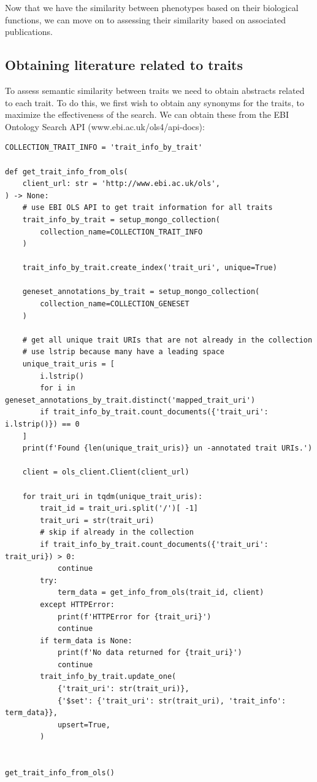 Now that we have the similarity between phenotypes based on their biological functions, we can move on to assessing their similarity based on associated publications.

\subsection{Obtaining literature related to traits}

To assess semantic similarity between traits we need to obtain abstracts related to each trait.  To do this, we first wish to obtain any synonyms for the traits, to maximize the effectiveness of the search.  We can obtain these from the EBI Ontology Search API (www.ebi.ac.uk/ols4/api-docs):

\begin{lstlisting}[style=Python]
COLLECTION_TRAIT_INFO = 'trait_info_by_trait'

def get_trait_info_from_ols(
    client_url: str = 'http://www.ebi.ac.uk/ols',
) -> None:
    # use EBI OLS API to get trait information for all traits
    trait_info_by_trait = setup_mongo_collection(
        collection_name=COLLECTION_TRAIT_INFO
    )

    trait_info_by_trait.create_index('trait_uri', unique=True)

    geneset_annotations_by_trait = setup_mongo_collection(
        collection_name=COLLECTION_GENESET
    )

    # get all unique trait URIs that are not already in the collection
    # use lstrip because many have a leading space
    unique_trait_uris = [
        i.lstrip()
        for i in geneset_annotations_by_trait.distinct('mapped_trait_uri')
        if trait_info_by_trait.count_documents({'trait_uri': i.lstrip()}) == 0
    ]
    print(f'Found {len(unique_trait_uris)} un -annotated trait URIs.')

    client = ols_client.Client(client_url)

    for trait_uri in tqdm(unique_trait_uris):
        trait_id = trait_uri.split('/')[ -1]
        trait_uri = str(trait_uri)
        # skip if already in the collection
        if trait_info_by_trait.count_documents({'trait_uri': trait_uri}) > 0:
            continue
        try:
            term_data = get_info_from_ols(trait_id, client)
        except HTTPError:
            print(f'HTTPError for {trait_uri}')
            continue
        if term_data is None:
            print(f'No data returned for {trait_uri}')
            continue
        trait_info_by_trait.update_one(
            {'trait_uri': str(trait_uri)},
            {'$set': {'trait_uri': str(trait_uri), 'trait_info': term_data}},
            upsert=True,
        )


get_trait_info_from_ols()
\end{lstlisting}

